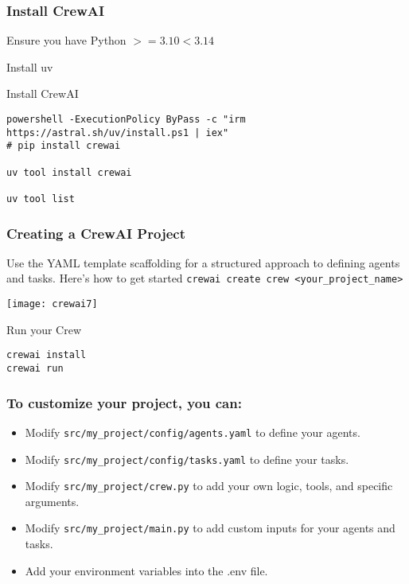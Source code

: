 \begin{frame}[fragile]\frametitle{Install CrewAI }

Ensure you have Python $>=3.10 <3.14$

Install uv

Install CrewAI 

    \begin{lstlisting}
powershell -ExecutionPolicy ByPass -c "irm https://astral.sh/uv/install.ps1 | iex"	
# pip install crewai

uv tool install crewai

uv tool list

    \end{lstlisting}			
\end{frame}


\begin{frame}[fragile]\frametitle{Creating a CrewAI Project}

Use the YAML template scaffolding for a structured approach to defining agents and tasks. Here’s how to get started \lstinline|crewai create crew <your_project_name>|


		\begin{center}
		\texttt{[image: crewai7]}
		\end{center}
		
Run your Crew		
    \begin{lstlisting}
crewai install
crewai run
    \end{lstlisting}			
\end{frame}


\begin{frame}[fragile]\frametitle{To customize your project, you can:}

    \begin{itemize}
        \item Modify \lstinline|src/my_project/config/agents.yaml| to define your agents.
        \item Modify \lstinline|src/my_project/config/tasks.yaml| to define your tasks.
        \item Modify \lstinline|src/my_project/crew.py| to add your own logic, tools, and specific arguments.
        \item Modify \lstinline|src/my_project/main.py| to add custom inputs for your agents and tasks.
        \item Add your environment variables into the .env file.
    \end{itemize}
\end{frame}


